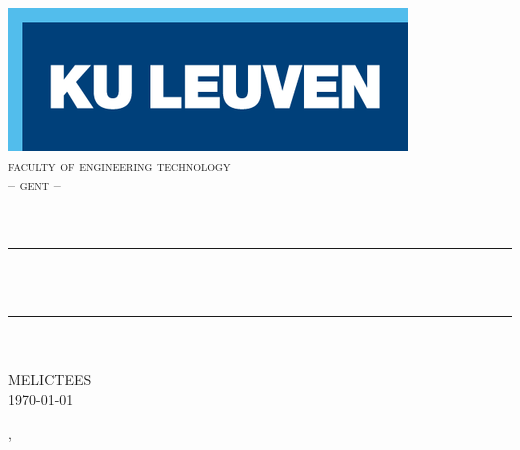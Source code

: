 \documentclass[11pt,a4paper,twoside]{article} %
\begin{document}
\begin{titlepage}																			
	\newcommand{\HRule}{\rule{\linewidth}{0.5mm}} %
	\center{} %
																																
																																				
	\includegraphics[scale=0.55]{logo_kuleuven.png}\\
	\textsc{\large faculty of engineering technology\\-- gent --}\\[2cm]
																																				
	\textsc{\LARGE \MakeUppercase{\mycourse}}\\[0.25cm] %
	\textsc{\Large \MakeLowercase{\mysubtitle}}\\[0.25cm] %
																																				
	\HRule \\[0.7cm] %
	{ \huge \bfseries \mytitle}	\\[0.4cm] %
	\HRule \\[1.4cm] %
																																				
	\Large \myauthor \\[0.4cm] %
	\large MELICTEES
	\\[1.4cm]
																																				
	{\Large \today }\\[1.4cm] %
																						
																																
																																				
\end{titlepage}
 ,
\end{document}
